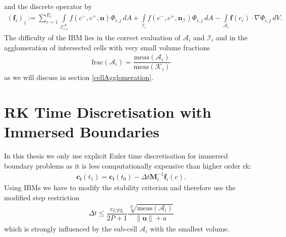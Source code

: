 	and the discrete operator by
	\begin{align}
		(\mathbf{f}_i)_j := \sum_{e=1}^{E_i}\int\limits_{\mathcal{E}_{i,e}^\mathcal{A}} f \left( c^-, c^+, \mathbf{n} \right) \Phi_{i,j} \, dA + \int\limits_{\mathcal{I}_{i}} f \left( c^-, c^+, \mathbf{n}_\mathcal{I} \right) \Phi_{i,j} \, dA - \int\limits_{\mathcal{A}_i} \boldsymbol{f}\left(c_i\right) \cdot \nabla\Phi_{i,j} \, dV.
	\end{align}
	The difficulty of the IBM lies in the correct evaluation of $\mathcal{A}_i$ and $\mathcal{I}_i$ and in the agglomeration of intersected cells with very small volume fractions 
	\begin{align}
		\text{frac}(\mathcal{A}_i) = \dfrac{\text{meas}(\mathcal{A}_i)}{\text{meas}(\mathcal{K}_i)}
	\end{align} 
	as we will discuss in section \ref{cellAgglomeration}.
	
	\section{RK Time Discretisation with Immersed Boundaries}
	In this thesis we only use explicit Euler time discretisation for immersed boundary problems as it is less computationally expensive than higher order \gls{rk}:
	\begin{align}
		\mathbf{c_i}(t_1) = \mathbf{c_i}(t_0)-\Delta t \mathbf{M}_i^{-1} \mathbf{f}_i (c).
	\end{align}
	Using IBMs we have to modify the stability criterion and therefore use the modified step restriction
	\begin{align}
		\Delta t \leq \dfrac{c_{CFL}}{2P+1} \dfrac{\sqrt[D]{\text{meas}(\mathcal{A}_i)}}{\|\mathbf{u} \| + a}
		\label{timestepIBM}
	\end{align}
	which is strongly influenced by the sub-cell $\mathcal{A}_i$ with the smallest volume.
	
